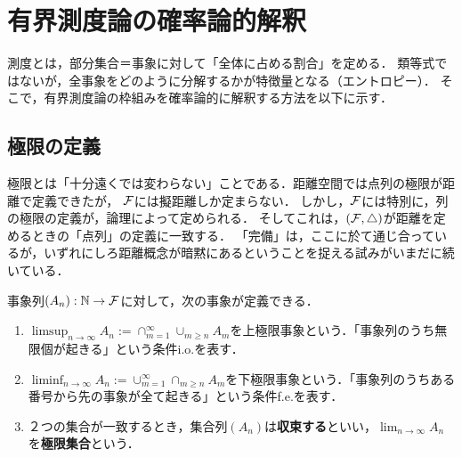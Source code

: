 \documentclass[uplatex,dvipdfmx]{jsreport}
\begin{document}
\section{有界測度論の確率論的解釈}\label{sec-event}

\begin{tcolorbox}[colframe=ForestGreen, colback=ForestGreen!10!white,breakable,colbacktitle=ForestGreen!40!white,coltitle=black,fonttitle=\bfseries\sffamily,
title=有界測度論]
    測度とは，部分集合＝事象に対して「全体に占める割合」を定める．
    類等式ではないが，全事象をどのように分解するかが特徴量となる（エントロピー）．
    そこで，有界測度論の枠組みを確率論的に解釈する方法を以下に示す．
\end{tcolorbox}

\subsection{極限の定義}

\begin{tcolorbox}[colframe=ForestGreen, colback=ForestGreen!10!white,breakable,colbacktitle=ForestGreen!40!white,coltitle=black,fonttitle=\bfseries\sffamily,
title=事象列には極限なる演算を定義したい]
    極限とは「十分遠くでは変わらない」ことである．距離空間では点列の極限が距離で定義できたが，
    $\mathcal{F}$には擬距離しか定まらない．
    しかし，$\mathcal{F}$には特別に，列の極限の定義が，論理によって定められる．
    そしてこれは，$(\mathcal{F},\triangle)$が距離を定めるときの「点列」の定義に一致する．
    「完備」は，ここに於て通じ合っているが，いずれにしろ距離概念が暗黙にあるということを捉える試みがいまだに続いている．
\end{tcolorbox}

\begin{definition}
    事象列$(A_n):\mathbb{N}\to\mathcal{F}$に対して，次の事象が定義できる．
    \begin{enumerate}
        \item $\limsup_{n\to\infty}A_n:=\cap^\infty_{m=1}\cup_{m\ge n}A_m$を上極限事象という．「事象列のうち無限個が起きる」という条件i.o.を表す．
        \item $\liminf_{n\to\infty}A_n:=\cup^\infty_{m=1}\cap_{m\ge n}A_m$を下極限事象という．「事象列のうちある番号から先の事象が全て起きる」という条件f.e.を表す．
        \item ２つの集合が一致するとき，集合列$(A_n)$は\textbf{収束する}といい，$\lim_{n\to\infty}A_n$を\textbf{極限集合}という．
    \end{enumerate}
\end{definition}
\end{document}
